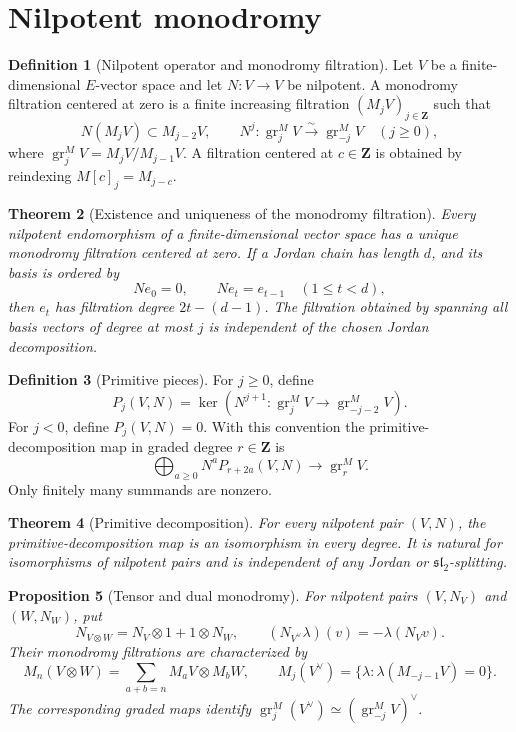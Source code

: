 \documentclass[10pt]{article}
\newtheorem{theorem}{Theorem}[section]
\newtheorem{proposition}[theorem]{Proposition}
\theoremstyle{definition}
\newtheorem{definition}[theorem]{Definition}
\newcommand{\gr}{\operatorname{gr}}
\begin{document}
\section{Nilpotent monodromy}

\begin{definition}[Nilpotent operator and monodromy filtration]
Let \(V\) be a finite-dimensional \(E\)-vector space and let
\(N:V\to V\) be nilpotent.  A monodromy filtration centered at zero is a
finite increasing filtration \((M_jV)_{j\in\mathbf Z}\) such that
\[
 N(M_jV)\subset M_{j-2}V,
 \qquad
 N^j:\gr_j^M V\xrightarrow{\sim}\gr_{-j}^M V
 \quad(j\ge0),
\]
where \(\gr_j^M V=M_jV/M_{j-1}V\).  A filtration centered at \(c\in\mathbf Z\)
is obtained by reindexing \(M[c]_j=M_{j-c}\).
\end{definition}

\begin{theorem}[Existence and uniqueness of the monodromy filtration]
Every nilpotent endomorphism of a finite-dimensional vector space has a
unique monodromy filtration centered at zero.  If a Jordan chain has length
\(d\), and its basis is ordered by
\[
 N e_0=0,\qquad N e_t=e_{t-1}\quad(1\le t<d),
\]
then \(e_t\) has filtration degree \(2t-(d-1)\).  The filtration obtained by
spanning all basis vectors of degree at most \(j\) is independent of the
chosen Jordan decomposition.

\end{theorem}

\begin{definition}[Primitive pieces]
For \(j\ge0\), define
\[
 P_j(V,N)=\ker\!\left(
 N^{j+1}:\gr_j^M V\longrightarrow\gr_{-j-2}^M V
\right).
\]
For \(j<0\), define \(P_j(V,N)=0\).  With this convention the
primitive-decomposition map in graded degree \(r\in\mathbf Z\) is
\[
       \bigoplus_{a\ge0}N^aP_{r+2a}(V,N)
       \longrightarrow\gr_r^M V.
\]
Only finitely many summands are nonzero.
\end{definition}

\begin{theorem}[Primitive decomposition]
For every nilpotent pair \((V,N)\), the primitive-decomposition map is an
isomorphism in every degree.  It is natural for isomorphisms of nilpotent
pairs and is independent of any Jordan or \(\mathfrak{sl}_2\)-splitting.
\end{theorem}

\begin{proposition}[Tensor and dual monodromy]
For nilpotent pairs \((V,N_V)\) and \((W,N_W)\), put
\[
 N_{V\otimes W}=N_V\otimes1+1\otimes N_W,
 \qquad
 (N_{V^\vee}\lambda)(v)=-\lambda(N_Vv).
\]
Their monodromy filtrations are characterized by
\[
 M_n(V\otimes W)=\sum_{a+b=n}M_aV\otimes M_bW,
 \qquad
 M_j(V^\vee)=\{\lambda:\lambda(M_{-j-1}V)=0\}.
\]
The corresponding graded maps identify
\(\gr_j^M(V^\vee)\simeq(\gr_{-j}^M V)^\vee\).
\end{proposition}
\end{document}

